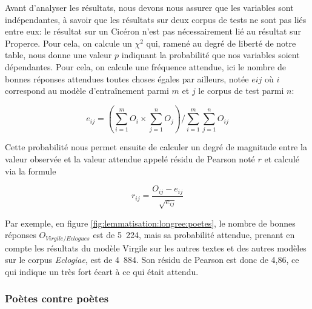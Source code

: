 Avant d'analyser les résultats, nous devons nous assurer que les variables sont indépendantes, à savoir que les résultats sur deux corpus de tests ne sont pas liés entre eux: le résultat sur un Cicéron n'est pas nécessairement lié au résultat sur Properce. Pour cela, on calcule un $\chi^{2}$ qui, ramené au degré de liberté de notre table, nous donne une valeur $p$ indiquant la probabilité que nos variables soient dépendantes. Pour cela, on calcule une fréquence attendue, ici le nombre de bonnes réponses attendues toutes choses égales par ailleurs, notée $e{ij}$ où $i$ correspond au modèle d'entraînement parmi $m$ et $j$ le corpus de test parmi $n$:

\begin{equation}
    e_{ij} = \left ( \sum_{i=1}^{m}O_{i} \times \sum_{j=1}^{n}O_{j}  \right ) / \sum_{i=1}^{m}\sum_{j=1}^{n}O_{ij}
\end{equation}

Cette probabilité nous permet ensuite de calculer un degré de magnitude entre la valeur observée et la valeur attendue appelé résidu de Pearson noté $r$ et calculé via la formule

\begin{equation}
    r_{ij} = \frac{O_{ij} - e_{ij}}{\sqrt{e_{ij}}}
\end{equation}

Par exemple, en figure \ref{fig:lemmatisation:longree:poetes}, le nombre de bonnes réponses $O_{Virgile/Eclogues}$ est de 5~224, mais sa probabilité attendue, prenant en compte les résultats du modèle Virgile sur les autres textes et des autres modèles sur le corpus \textit{Eclogiae}, est de 4~884. Son résidu de Pearson est donc de 4,86, ce qui indique un très fort écart à ce qui était attendu.

\subsubsection{Poètes contre poètes}

